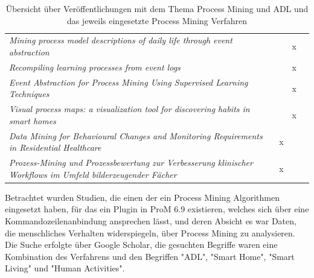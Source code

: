 \begin{table}[ht]
\begin{tabularx}{\textwidth}{b ccc}
\textit{Mining process model descriptions of daily life through event abstraction}                                  &                                        & x                                      &                                         \\
\textit{Recompiling learning processes from event logs}                                                             &                                        & x                                      &                                         \\
\textit{Event Abstraction for Process Mining Using Supervised Learning Techniques}                                  &                                        & x                                      &                                         \\
\textit{Visual process maps: a visualization tool for discovering habits in smart homes}                            &                                        & x                                      &                                         \\
\textit{Data Mining for Behavioural Changes and Monitoring Requirements in Residential Healthcare}                  & x                                      &                                        &                                         \\
\textit{Prozess-Mining und Prozessbewertung zur Verbesserung klinischer Workflows im Umfeld bilderzeugender Fächer} & x                                      &                                        &                                         \\ \hline

\end{tabularx}

\caption{Übersicht über Veröffentlichungen mit dem Thema Process Mining und ADL und das jeweils eingesetzte Process Mining Verfahren}
 \label{tab:miningPaper}
\end{table}
\normalsize
Betrachtet wurden Studien, die einen der ein Process Mining Algorithmen eingesetzt haben, für das ein Plugin in ProM 6.9 existieren, welches sich über eine Kommandozeilenanbindung ansprechen lässt, und deren Absicht es war Daten, die menschliches Verhalten widerspiegeln, über Process Mining zu analysieren. Die Suche erfolgte über Google Scholar, die gesuchten Begriffe waren eine Kombination des Verfahrens und den Begriffen "ADL", "Smart Home", "Smart Living" und "Human Activities". 
